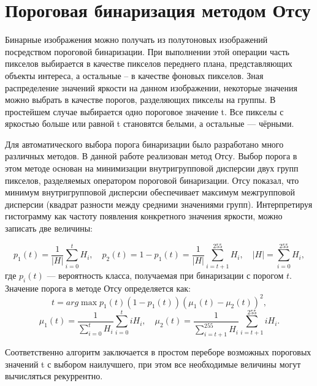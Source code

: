 \documentclass[12pt,a4paper]{extarticle} %
\begin{document}

\newpage
\tableofcontents
\newpage

\section{Пороговая бинаризация методом Отсу}

    Бинарные изображения можно получать из полутоновых изображений посредством пороговой бинаризации. При выполнении этой операции часть пикселов выбирается в качестве пикселов переднего плана, представляющих объекты интереса, а остальные – в качестве фоновых пикселов. Зная распределение значений яркости на данном изображении, некоторые значения можно выбрать в качестве порогов, разделяющих пикселы на группы. В простейшем случае выбирается одно пороговое значение t. Все пикселы с яркостью больше или равной t становятся белыми, а остальные --- чёрными.\

    Для автоматического выбора порога бинаризации было разработано много различных методов. В данной работе реализован метод Отсу. Выбор порога в этом методе основан на минимизации внутригрупповой дисперсии двух групп пикселов, разделяемых оператором пороговой бинаризации. Отсу показал, что минимум внутригрупповой дисперсии обеспечивает максимум межгрупповой дисперсии (квадрат разности между средними значениями групп).
Интерпретируя гистограмму как частоту появления конкретного значения яркости, можно записать две величины:

\begin{equation*}
    p_1(t) = \frac{1}{| H |} \sum\limits_{i=0}^{t} H_i, \quad p_2(t)=1 - p_1(t) =  \frac{1}{| H |} \sum\limits_{i=t+1}^{255} H_i, \quad |H| = \sum\limits_{i=0}^{255} H_i,
\end{equation*}
где $p_i(t)$ --- вероятность класса, получаемая при бинаризации с порогом $t$. Значение порога в методе Отсу определяется как:
\begin{equation*}
    t= arg\max p_1(t)(1 - p_1(t))(\mu_1(t) - \mu_2(t))^2,
\end{equation*}
\begin{equation*}
     \mu_1(t) = \frac{1}{\sum\limits_{i=0}^t H_i} \sum\limits_{i=0}^t i H_i, \quad \mu_2(t) = \frac{1}{\sum\limits_{i=t+1}^{255} H_i} \sum\limits_{i=t+1}^{255} i H_i.
\end{equation*}

    Соответственно алгоритм заключается в простом переборе возможных пороговых значений t с выбором наилучшего, при этом все необходимые величины могут вычисляться рекуррентно.
\end{document}
